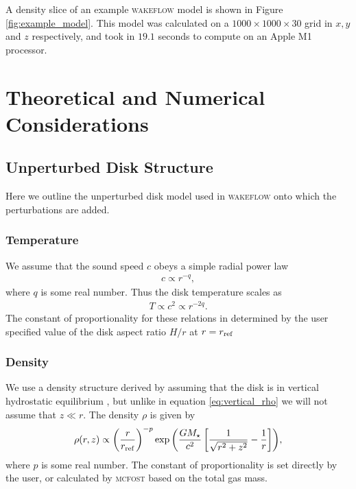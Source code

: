 \noindent A density slice of an example \textsc{wakeflow} model is shown in Figure \ref{fig:example_model}.
This model was calculated on a $1000 \times 1000 \times 30$ grid in $x,y$ and $z$ respectively, and took in $19.1$ seconds to compute on an Apple M1 processor.

\section{Theoretical and Numerical Considerations} \label{sec:model_considerations}

\subsection{Unperturbed Disk Structure} \label{sec:diskstruct}

Here we outline the unperturbed disk model used in \textsc{wakeflow} onto which the perturbations are added.

\subsubsection{Temperature}

We assume that the sound speed $c$ obeys a simple radial power law 
\begin{align}
    c \propto r^{-q},
\end{align}
where $q$ is some real number. Thus the disk temperature scales as 
\begin{align}
    T \propto c^2 \propto r^{-2q}.
\end{align}
The constant of proportionality for these relations in determined by the user specified value of the disk aspect ratio $H/r$ at $r=r_{\rm ref}$

\subsubsection{Density}

We use a density structure derived by assuming that the disk is in vertical hydrostatic equilibrium \citep{pringle1981}, but unlike in equation \ref{eq:vertical_rho} we will not assume that $z\ll r$.
The density $\rho$ is given by 
\begin{align}
    \rho(r,z) \propto \left( \frac{r}{r_{\rm ref}} \right)^{-p} \exp{\left( \frac{G M_\star}{c^2} \left[ \frac{1}{\sqrt{r^2 + z^2}} - \frac{1}{r} \right] \right)},
\end{align}
where $p$ is some real number. 
The constant of proportionality is set directly by the user, or calculated by \textsc{mcfost} based on the total gas mass.

